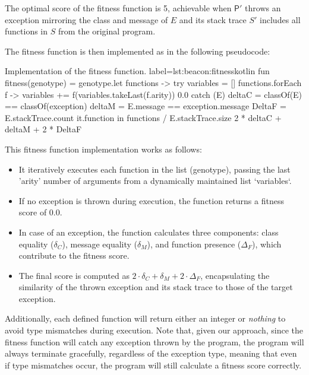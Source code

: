         The optimal score of the fitness function is 5, achievable when \(\mathsf{P'}\) throws an exception mirroring 
        the class and message of \(E\) and its stack trace \(S'\) includes all functions in \(S\) from the original 
        program.
    
        The fitness function is then implemented as in the following pseudocode:

        \begin{code}{%
            Implementation of the fitness function.
        }{label=lst:beacon:fitness}{kotlin}
            fun fitness(genotype) = genotype.let { functions ->
                try {
                    variables = []
                    functions.forEach { f ->
                        variables += f(variables.takeLast(f.arity))
                    }
                    0.0
                } catch (E) {
                    deltaC = classOf(E) == classOf(exception)
                    deltaM = E.message == exception.message
                    DeltaF = E.stackTrace.count { it.function in functions } / E.stackTrace.size
                    2 * deltaC + deltaM + 2 * DeltaF
                }
            }
        \end{code}

        This fitness function implementation works as follows: 
        \begin{itemize}
            \item It iteratively executes each function in the list (genotype), passing the last 'arity' number of arguments from a dynamically maintained list `variables`. 
            \item If no exception is thrown during execution, the function returns a fitness score of 0.0.
            \item In case of an exception, the function calculates three components: class equality (\(\delta_C\)), message equality (\(\delta_M\)), and function presence (\(\Delta_F\)), which contribute to the fitness score.
            \item The final score is computed as \(2 \cdot \delta_C + \delta_M + 2 \cdot \Delta_F\), encapsulating the similarity of the thrown exception and its stack trace to those of the target exception.
        \end{itemize}
        
        Additionally, each defined function will return either an integer or \textit{nothing} to avoid type mismatches
        during execution. Note that, given our approach, since the fitness function will catch any exception thrown by
        the program, the program will always terminate gracefully, regardless of the exception type, meaning that even
        if type mismatches occur, the program will still calculate a fitness score correctly.

